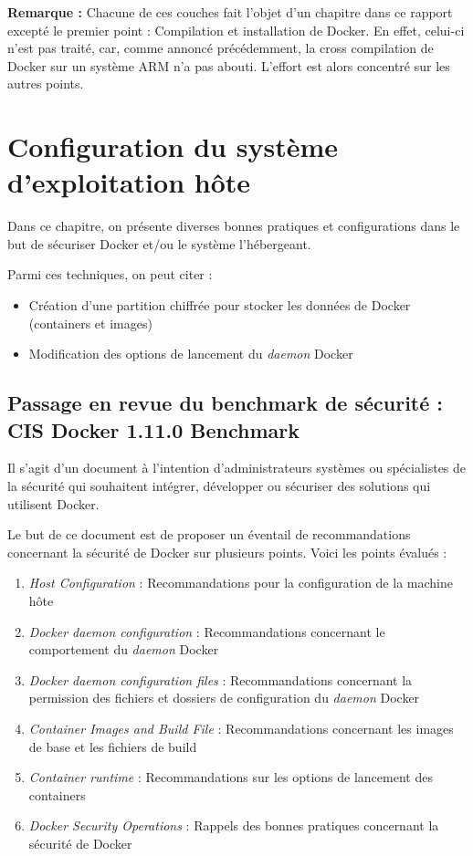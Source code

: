 \documentclass[11pt,a4paper,oneside]{report}
\begin{document}
\textbf{Remarque : } Chacune de ces couches fait l'objet d'un chapitre dans ce rapport excepté le premier point : Compilation et installation de Docker. En effet, celui-ci n'est pas traité, car, comme annoncé précédemment, la cross compilation de Docker sur un système ARM n'a pas abouti. L'effort est alors concentré sur les autres points.


\chapter{Configuration du système d'exploitation hôte}\label{config_systeme_os_hote}
Dans ce chapitre, on présente diverses bonnes pratiques et configurations dans le but de sécuriser Docker et/ou le système l'hébergeant.

Parmi ces techniques, on peut citer :

\begin{itemize}
\item Création d'une partition chiffrée pour stocker les données de Docker (containers et images)
\item Modification des options de lancement du \textit{daemon} Docker
\end{itemize}


\section{Passage en revue du benchmark de sécurité : CIS Docker 1.11.0 Benchmark}
Il s'agit d'un document à l'intention d'administrateurs systèmes ou spécialistes de la sécurité qui souhaitent intégrer, développer ou sécuriser des solutions qui utilisent Docker.

Le but de ce document est de proposer un éventail de recommandations concernant la sécurité de Docker sur plusieurs points. Voici les points évalués :
\begin{enumerate}
\item \textit{Host Configuration} : Recommandations pour la configuration de la machine hôte
\item \textit{Docker daemon configuration} : Recommandations concernant le comportement du \textit{daemon} Docker
\item \textit{Docker daemon configuration files} : Recommandations concernant la permission des fichiers et dossiers de configuration du \textit{daemon} Docker
\item \textit{Container Images and Build File} : Recommandations concernant les images de base et les fichiers de build
\item \textit{Container runtime} : Recommandations sur les options de lancement des containers
\item \textit{Docker Security Operations} : Rappels des bonnes pratiques concernant la sécurité de Docker
\end{enumerate}
\end{document}

